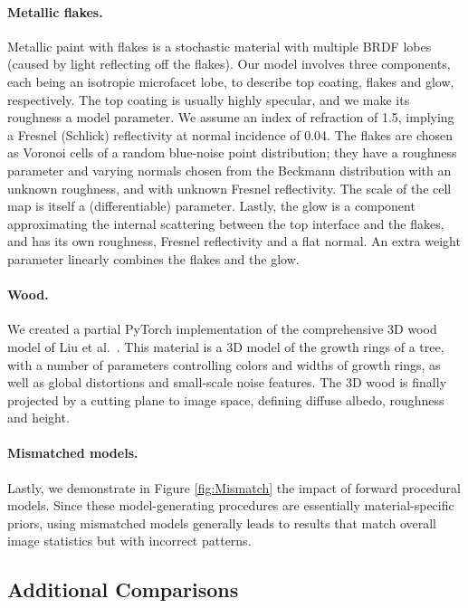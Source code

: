\paragraph*{Metallic flakes.} Metallic paint with flakes is a stochastic material with multiple BRDF lobes (caused by light reflecting off the flakes). Our model involves three components, each being an isotropic microfacet lobe, to describe top coating, flakes and glow, respectively. The top coating is usually highly specular, and we make its roughness a model parameter. We assume an index of refraction of 1.5, implying a Fresnel (Schlick) reflectivity at normal incidence of 0.04. The flakes are chosen as Voronoi cells of a random blue-noise point distribution; they have a roughness parameter and varying normals chosen from the Beckmann distribution with an unknown roughness, and with unknown Fresnel reflectivity. The scale of the cell map is itself a (differentiable) parameter. Lastly, the glow is a component approximating the internal scattering between the top interface and the flakes, and has its own roughness, Fresnel reflectivity and a flat normal. An extra weight parameter linearly combines the flakes and the glow.

\paragraph*{Wood.} We  created a partial \textsf{PyTorch} implementation of the comprehensive 3D wood model of Liu et al.~\cite{Liu2016}. This material is a 3D model of the growth rings of a tree, with a number of parameters controlling colors and widths of growth rings, as well as global distortions and small-scale noise features. The 3D wood is finally projected by a cutting plane to image space, defining diffuse albedo, roughness and height.



\paragraph*{Mismatched models.}
Lastly, we demonstrate in Figure \ref{fig:Mismatch} the impact of forward procedural models.
Since these model-generating procedures are essentially material-specific priors, using mismatched models generally leads to results that match overall image statistics but with incorrect patterns.

\subsection{Additional Comparisons}

